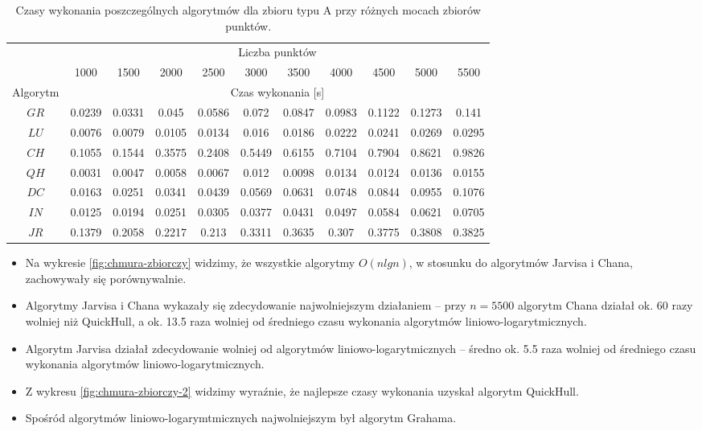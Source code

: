\documentclass[11pt]{article}
\theoremstyle{remark} \newtheorem{definition}{def.}
\theoremstyle{definition} \newtheorem{twierdzenie}{tw.}
\begin{document}
\begin{table}[h]
\centering
\caption{Czasy wykonania poszczególnych algorytmów dla zbioru typu A przy różnych mocach zbiorów punktów.}
\label{tab:chmura}
\begin{tabular}{c|c|c|c|c|c|c|c|c|c|c|}
\cline{2-11}
\multicolumn{1}{l|}{} & \multicolumn{10}{c|}{Liczba punktów} \\ \cline{2-11} 
\multicolumn{1}{l|}{} & 1000 & 1500 & 2000 & 2500 & 3000 & 3500 & 4000 & 4500 & 5000 & 5500 \\ \hline
\multicolumn{1}{|c|}{Algorytm} & \multicolumn{10}{c|}{Czas wykonania {[}s{]}} \\ \hline
\multicolumn{1}{|c|}{$GR$} & 0.0239 & 0.0331 & 0.045 & 0.0586 & 0.072 & 0.0847 & 0.0983 & 0.1122 & 0.1273 & 0.141 \\ \hline
\multicolumn{1}{|c|}{$LU$} & 0.0076 & 0.0079 & 0.0105 & 0.0134 & 0.016 & 0.0186 & 0.0222 & 0.0241 & 0.0269 & 0.0295 \\ \hline
\multicolumn{1}{|c|}{$CH$} & 0.1055 & 0.1544 & 0.3575 & 0.2408 & 0.5449 & 0.6155 & 0.7104 & 0.7904 & 0.8621 & 0.9826 \\ \hline
\multicolumn{1}{|c|}{$QH$} & 0.0031 & 0.0047 & 0.0058 & 0.0067 & 0.012 & 0.0098 & 0.0134 & 0.0124 & 0.0136 & 0.0155 \\ \hline
\multicolumn{1}{|c|}{$DC$} & 0.0163 & 0.0251 & 0.0341 & 0.0439 & 0.0569 & 0.0631 & 0.0748 & 0.0844 & 0.0955 & 0.1076 \\ \hline
\multicolumn{1}{|c|}{$IN$} & 0.0125 & 0.0194 & 0.0251 & 0.0305 & 0.0377 & 0.0431 & 0.0497 & 0.0584 & 0.0621 & 0.0705 \\ \hline
\multicolumn{1}{|c|}{$JR$} & 0.1379 & 0.2058 & 0.2217 & 0.213 & 0.3311 & 0.3635 & 0.307 & 0.3775 & 0.3808 & 0.3825 \\ \hline
\end{tabular}
\end{table}

\begin{itemize}
    \item Na wykresie \ref{fig:chmura-zbiorczy} widzimy, że wszystkie algorytmy $O(n lgn)$, w stosunku do algorytmów Jarvisa i Chana, zachowywały się porównywalnie.
    \item  Algorytmy Jarvisa i Chana wykazały się zdecydowanie
najwolniejszym działaniem -- przy $n = 5500$ algorytm Chana działał ok. 60 razy wolniej niż QuickHull, a ok. 13.5 raza wolniej od średniego czasu wykonania algorytmów liniowo-logarytmicznych.
    \item Algorytm Jarvisa działał zdecydowanie wolniej od algorytmów liniowo-logarytmicznych -- średno ok. 5.5 raza wolniej od średniego czasu wykonania algorytmów liniowo-logarytmicznych. 
    \item Z wykresu \ref{fig:chmura-zbiorczy-2} widzimy wyraźnie, że najlepsze czasy wykonania uzyskał algorytm QuickHull.
    \item Spośród algorytmów liniowo-logarymtmicznych najwolniejszym był algorytm Grahama.  
\end{itemize}
\end{document}

